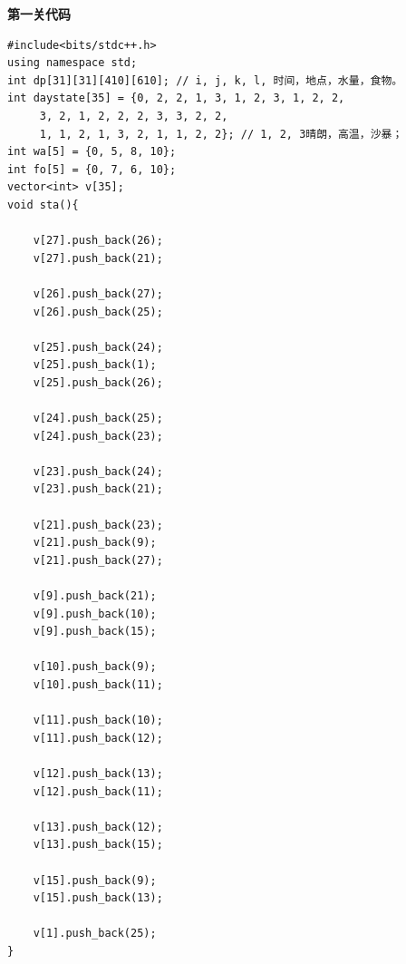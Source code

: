 \textbf{第一关代码}
\begin{verbatim}
#include<bits/stdc++.h>
using namespace std;
int dp[31][31][410][610]; // i, j, k, l, 时间，地点，水量，食物。
int daystate[35] = {0, 2, 2, 1, 3, 1, 2, 3, 1, 2, 2,
     3, 2, 1, 2, 2, 2, 3, 3, 2, 2, 
     1, 1, 2, 1, 3, 2, 1, 1, 2, 2}; // 1, 2, 3晴朗，高温，沙暴；
int wa[5] = {0, 5, 8, 10};
int fo[5] = {0, 7, 6, 10};
vector<int> v[35];
void sta(){

    v[27].push_back(26); 
    v[27].push_back(21);
    
    v[26].push_back(27); 
    v[26].push_back(25);
    
    v[25].push_back(24); 
    v[25].push_back(1); 
    v[25].push_back(26);
    
    v[24].push_back(25); 
    v[24].push_back(23);
    
    v[23].push_back(24); 
    v[23].push_back(21);
    
    v[21].push_back(23); 
    v[21].push_back(9); 
    v[21].push_back(27);
    
    v[9].push_back(21); 
    v[9].push_back(10); 
    v[9].push_back(15);
    
    v[10].push_back(9); 
    v[10].push_back(11);
    
    v[11].push_back(10); 
    v[11].push_back(12);
    
    v[12].push_back(13); 
    v[12].push_back(11);
    
    v[13].push_back(12); 
    v[13].push_back(15);
    
    v[15].push_back(9); 
    v[15].push_back(13);
    
    v[1].push_back(25);
}


\end{verbatim}
